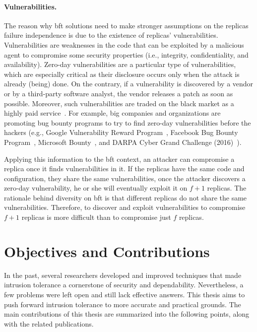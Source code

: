 \paragraph{Vulnerabilities.}
The reason why \gls{bft} solutions need to make stronger assumptions on the replicas failure independence is due to the existence of replicas' vulnerabilities.
Vulnerabilities are weaknesses in the code that can be exploited by a malicious agent to compromise some security properties (i.e., integrity, confidentiality, and availability).
Zero-day vulnerabilities are a particular type of vulnerabilities, which are especially critical as their disclosure occurs only when the attack is already (being) done.
On the contrary, if a vulnerability is discovered by a vendor or by a third-party software analyst, the vendor releases a patch as soon as possible. 
Moreover, such vulnerabilities are traded on the black market as a highly paid service~\cite{Symantec:2017,Allodi:2017}.
For example, big companies and organizations are promoting bug bounty programs to try to find zero-day vulnerabilities before the hackers (e.g., Google Vulnerability Reward Program~\cite{google_reward}, Facebook Bug Bounty Program~\cite{facebook_whitehat}, Microsoft Bounty~\cite{microsoft_bounty}, and DARPA Cyber Grand Challenge (2016)~\cite{darpa}).



Applying this information to the \gls{bft} context, an attacker can compromise a replica once it finds vulnerabilities in it.
If the replicas have the same code and configuration, they share the same vulnerabilities, once the attacker discovers a zero-day vulnerability, he or she will eventually exploit it on $f+1$ replicas.
The rationale behind diversity on \gls{bft} is that different replicas do not share the same vulnerabilities. 
Therefore, to discover and exploit vulnerabilities to compromise $f+1$ replicas is more difficult than to compromise just $f$ replicas.




\section{Objectives and Contributions}

In the past, several researchers developed and improved techniques that made intrusion tolerance a cornerstone of security and dependability.
Nevertheless, a few problems were left open and still lack effective answers.
This thesis aims to push forward intrusion tolerance to more accurate and practical grounds.
The main contributions of this thesis are summarized into the following points, along with the related publications.


